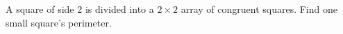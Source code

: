 A square of side 2 is divided into a $2\times2$ array of congruent squares. Find one small square's perimeter.
